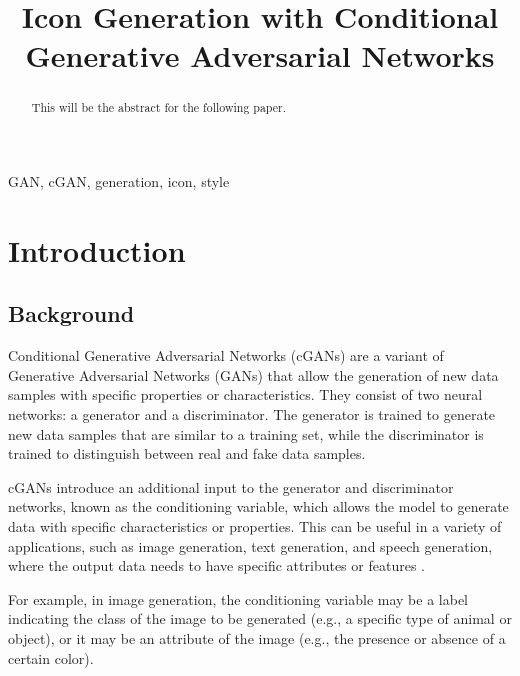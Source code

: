 \documentclass[conference]{IEEEtran}
\begin{document}
\title{Icon Generation with Conditional Generative Adversarial Networks}

\author{
}
\maketitle

\begin{abstract}
This will be the abstract for the following paper.
\end{abstract}

\begin{IEEEkeywords}
GAN, cGAN, generation, icon, style
\end{IEEEkeywords}

\section{Introduction}
\subsection{Background}
Conditional Generative Adversarial Networks (cGANs) \cite{Mirza2014} are a variant of Generative Adversarial Networks (GANs) that allow the generation of new data samples with specific properties or characteristics. They consist of two neural networks: a generator and a discriminator. The generator is trained to generate new data samples that are similar to a training set, while the discriminator is trained to distinguish between real and fake data samples.

cGANs introduce an additional input to the generator and discriminator networks, known as the conditioning variable, which allows the model to generate data with specific characteristics or properties. This can be useful in a variety of applications, such as image generation, text generation, and speech generation, where the output data needs to have specific attributes or features \cite{Mirza2014}.

For example, in image generation, the conditioning variable may be a label indicating the class of the image to be generated (e.g., a specific type of animal or object), or it may be an attribute of the image (e.g., the presence or absence of a certain color).
\end{document}
